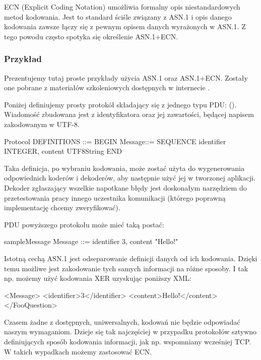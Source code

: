 \documentclass[00-praca-magisterska.tex]{subfiles}
\begin{document}
ECN (Explicit Coding Notation) umożliwia formalny opis niestandardowych metod
kodowania. Jest to standard ściśle związany z ASN.1 i opis danego kodowania
zawsze łączy się z pewnym opisem danych wyrażonych w ASN.1. Z tego powodu często
spotyka się określenie ASN.1+ECN.

\subsubsection{Przykład}

Prezentujemy tutaj proste przykłady użycia ASN.1 oraz ASN.1+ECN. Zostały one
pobrane z materiałów szkoleniowych dostępnych w internecie \cite{asn1-main,ecn-tutorial1,ecn-tutorial2,ecn-tutorial3}.

Poniżej definiujemy prosty protokół składający się z jednego typu PDU:
(). Wiadomość zbudowana jest z identyfikatora oraz jej
zawartości, będącej napisem zakodowanym w UTF-8.

\begin{textcode}
  Protocol DEFINITIONS ::= BEGIN
       Message::= SEQUENCE {
          identifier INTEGER,
          content    UTF8String
      }
  END
\end{textcode}

Taka definicja, po wybraniu kodowania, może zostać użyta do wygenerowania
odpowiednich koderów i dekoderów, aby następnie użyć jej w tworzonej aplikacji.
Dekoder zgłaszający wszelkie napotkane błędy jest doskonałym narzędziem do
przetestowania pracy innego uczestnika komunikacji (którego poprawną
implementację chcemy zweryfikować).

PDU powyższego protokołu może mieć taką postać:

\begin{textcode}
  sampleMessage Message ::= {
      identifier     3,
      content        "Hello!"
  }
\end{textcode}

Istotną cechą ASN.1 jest odseparowanie definicji danych od ich kodowania.
Dzięki temu możliwe jest zakodowanie tych samych informacji na różne sposoby. I
tak np. możemy użyć kodowania XER uzyskując poniższy XML:

\begin{xmlcode}
  <Message>
      <identifier>3</identifier>
      <content>Hello!</content>
  </FooQuestion>
\end{xmlcode}

Czasem żadne z dostępnych, uniwersalnych, kodowań nie będzie odpowiadać naszym
wymaganiom. Dzieje się tak najczęściej w przypadku protokołów sztywno
definiujących sposób kodowania informacji, jak np. wspomniany wcześniej TCP. W
takich wypadkach możemy zastosować ECN.
\end{document}
